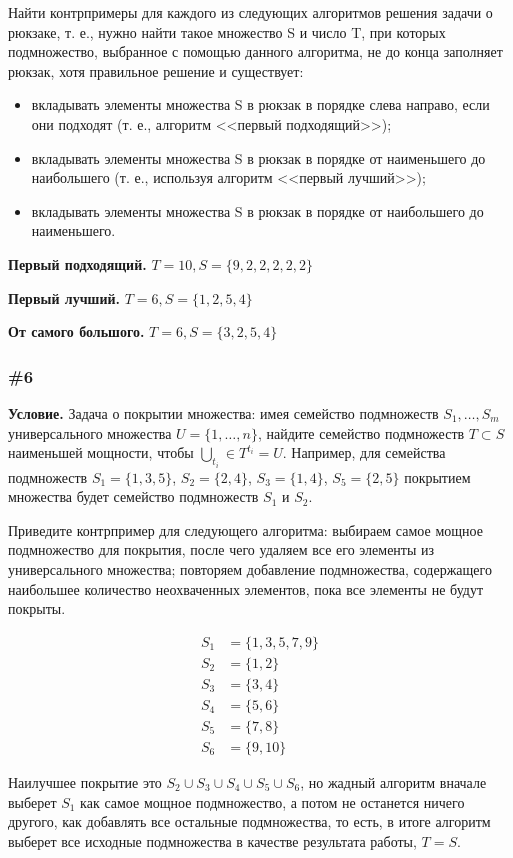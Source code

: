 \documentclass{article}
\begin{document}
Найти контрпримеры для каждого из следующих алгоритмов решения задачи о рюкзаке,
т. е., нужно найти такое множество S и число T, при которых подмножество,
выбранное с помощью данного алгоритма, не до конца заполняет рюкзак,
хотя правильное решение и существует:

\begin{itemize}
    \item вкладывать элементы множества S в рюкзак в порядке слева направо, если они подходят (т. е., алгоритм <<первый подходящий>>);
    \item вкладывать элементы множества S в рюкзак в порядке от наименьшего до наибольшего
          (т. е., используя алгоритм <<первый лучший>>);
    \item вкладывать элементы множества S в рюкзак в порядке от наибольшего до наименьшего.
\end{itemize}

\textbf{Первый подходящий.}
\(T = 10, S = \{9, 2, 2, 2, 2, 2\}\)

\textbf{Первый лучший.}
\(T = 6, S = \{1, 2, 5, 4\}\)

\textbf{От самого большого.}
\(T = 6, S = \{3, 2, 5, 4\}\)

\subsubsection{\#6}

\textbf{Условие.}
Задача о покрытии множества: имея семейство подмножеств \(S_1, \ldots, S_m\) универсального
множества \(U = \{1, \ldots, n\}\), найдите семейство подмножеств \(T \subset S\) 
наименьшей мощности, чтобы \(\bigcup_{t_i} \in T^{t_i} = U\).
Например, для семейства подмножеств \(S_1 = \{1, 3, 5\}\), \(S_2 = \{2, 4\}\), \(S_3 = \{1, 4\}\),
\(S_5 = \{2,5\}\) покрытием множества будет семейство подмножеств \(S_1\) и \(S_2\).

Приведите контрпример для следующего алгоритма: выбираем самое мощное подмножество для покрытия,
после чего удаляем все его элементы из универсального множества; повторяем добавление подмножества,
содержащего наибольшее количество неохваченных элементов, пока все элементы не будут покрыты.

\begin{align}
    S_1 &= \{1, 3, 5, 7, 9\}\\
    S_2 &= \{1, 2\}\\
    S_3 &= \{3, 4\}\\
    S_4 &= \{5, 6\}\\
    S_5 &= \{7, 8\}\\
    S_6 &= \{9, 10\}
\end{align}

Наилучшее покрытие это \(S_2 \cup S_3 \cup S_4 \cup S_5 \cup S_6\),
но жадный алгоритм вначале выберет \(S_1\) как самое мощное подмножество,
а потом не останется ничего другого, как добавлять все остальные подмножества,
то есть, в итоге алгоритм выберет все исходные подмножества в качестве результата работы, \(T = S\).
\end{document}
